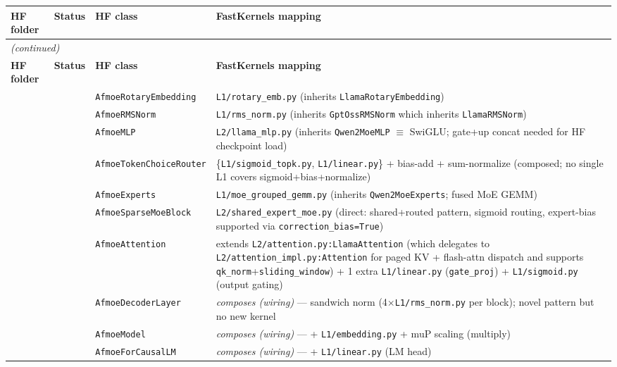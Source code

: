 \documentclass[10pt]{article}
\newcommand{\cmark}{\ding{51}}
\newcommand{\fastkernels}{FastKernels}
\begin{document}
{\scriptsize
\setlength{\tabcolsep}{4pt}
\renewcommand{\arraystretch}{1.18}
\begin{longtable}{@{}p{1.6cm} c p{4.0cm} p{14.5cm}@{}}
\toprule
\textbf{HF folder} & \textbf{Status} & \textbf{HF class} & \textbf{\fastkernels{} mapping} \\
\midrule
\endfirsthead
\multicolumn{4}{l}{\small\textit{(continued)}} \\
\toprule
\textbf{HF folder} & \textbf{Status} & \textbf{HF class} & \textbf{\fastkernels{} mapping} \\
\midrule
\endhead
\bottomrule
\endfoot

\multirow{10}{*}{\texttt{afmoe}} & \multirow{10}{*}{\cmark}
   & \texttt{AfmoeRotaryEmbedding}    & \texttt{L1/rotary\_emb.py} \quad (inherits \texttt{LlamaRotaryEmbedding}) \\
&& \texttt{AfmoeRMSNorm}              & \texttt{L1/rms\_norm.py} \quad (inherits \texttt{GptOssRMSNorm} which inherits \texttt{LlamaRMSNorm}) \\
&& \texttt{AfmoeMLP}                  & \texttt{L2/llama\_mlp.py} \quad (inherits \texttt{Qwen2MoeMLP} $\equiv$ SwiGLU; gate+up concat needed for HF checkpoint load) \\
&& \texttt{AfmoeTokenChoiceRouter}    & \{\texttt{L1/sigmoid\_topk.py}, \texttt{L1/linear.py}\} + bias-add + sum-normalize (composed; no single L1 covers sigmoid+bias+normalize) \\
&& \texttt{AfmoeExperts}              & \texttt{L1/moe\_grouped\_gemm.py} \quad (inherits \texttt{Qwen2MoeExperts}; fused MoE GEMM) \\
&& \texttt{AfmoeSparseMoeBlock}       & \texttt{L2/shared\_expert\_moe.py} \quad (direct: shared+routed pattern, sigmoid routing, expert-bias supported via \texttt{correction\_bias=True}) \\
&& \texttt{AfmoeAttention}            & extends \texttt{L2/attention.py:LlamaAttention} (which delegates to \texttt{L2/attention\_impl.py:Attention} for paged KV + flash-attn dispatch and supports \texttt{qk\_norm}+\texttt{sliding\_window}) + 1 extra \texttt{L1/linear.py} (\texttt{gate\_proj}) + \texttt{L1/sigmoid.py} (output gating) \\
&& \texttt{AfmoeDecoderLayer}         & \textit{composes (wiring)} --- sandwich norm (4$\times$\texttt{L1/rms\_norm.py} per block); novel pattern but no new kernel \\
&& \texttt{AfmoeModel}                & \textit{composes (wiring)} --- + \texttt{L1/embedding.py} + muP scaling (multiply) \\
&& \texttt{AfmoeForCausalLM}          & \textit{composes (wiring)} --- + \texttt{L1/linear.py} (LM head) \\
\midrule


\end{longtable}}
\end{document}
